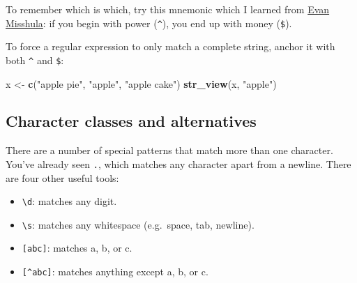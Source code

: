 \documentclass[]{book}
\newenvironment{Shaded}{\begin{snugshade}}{\end{snugshade}}
\newcommand{\KeywordTok}[1]{\textcolor[rgb]{0.13,0.29,0.53}{\textbf{#1}}}
\newcommand{\NormalTok}[1]{#1}
\newcommand{\StringTok}[1]{\textcolor[rgb]{0.31,0.60,0.02}{#1}}
\providecommand{\tightlist}{%
  \setlength{\itemsep}{0pt}\setlength{\parskip}{0pt}}
\begin{document}
To remember which is which, try this mnemonic which I learned from \href{https://twitter.com/emisshula/status/323863393167613953}{Evan Misshula}: if you begin with power (\texttt{\^{}}), you end up with money (\texttt{\$}).

To force a regular expression to only match a complete string, anchor it with both \texttt{\^{}} and \texttt{\$}:

\begin{Shaded}
\begin{Highlighting}[]
\NormalTok{x <-}\StringTok{ }\KeywordTok{c}\NormalTok{(}\StringTok{"apple pie"}\NormalTok{, }\StringTok{"apple"}\NormalTok{, }\StringTok{"apple cake"}\NormalTok{)}
\KeywordTok{str_view}\NormalTok{(x, }\StringTok{"apple"}\NormalTok{)}
\end{Highlighting}
\end{Shaded}

\hypertarget{htmlwidget-1fb4450895fe099f74a1}{}

\begin{Shaded}
\end{Shaded}

\hypertarget{htmlwidget-10b3b7155e8045a1b2ad}{}

\hypertarget{character-classes-and-alternatives}{%
\subsection{Character classes and alternatives}\label{character-classes-and-alternatives}}

There are a number of special patterns that match more than one character. You've already seen \texttt{.}, which matches any character apart from a newline. There are four other useful tools:

\begin{itemize}
\tightlist
\item
  \texttt{\textbackslash{}d}: matches any digit.
\item
  \texttt{\textbackslash{}s}: matches any whitespace (e.g.~space, tab, newline).
\item
  \texttt{{[}abc{]}}: matches a, b, or c.
\item
  \texttt{{[}\^{}abc{]}}: matches anything except a, b, or c.
\end{itemize}
\end{document}
